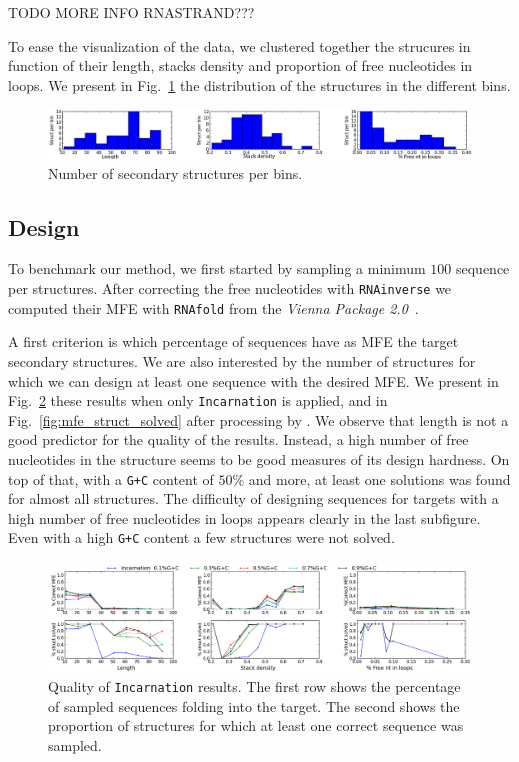  TODO MORE INFO RNASTRAND???
 
 To ease the visualization of the data, we clustered together the strucures
 in function of their length, stacks density and proportion of free 
 nucleotides in loops. We present in Fig.~\ref{fig:bins} the distribution
 of the structures in the different bins.
 
 \begin{figure}[ht!]
 	\centering
	\includegraphics[scale=0.45]{Figures/bins_distribution.png}
	\caption{Number of secondary structures per bins.}
	\label{fig:bins}
 \end{figure}
 
 
\subsection{Design}
 To benchmark our method, we first started by sampling a minimum
 $100$ sequence per structures. After correcting the free nucleotides with
 \texttt{RNAinverse} we computed their MFE with \texttt{RNAfold} from the \textit{Vienna Package 2.0}~\cite{Hofacker:1994}.
 
A first criterion is which percentage of sequences have as MFE the target
secondary structures. We are also interested by the number of structures
for which we can design at least one sequence with the desired MFE.
We present in 
 Fig.~\ref{fig:mfe_struct_solved_noinverse} these results when only
 \texttt{Incarnation} is applied, and 
in Fig.~\ref{fig:mfe_struct_solved} after processing by \RNAinverse. We observe
that length is not a good predictor for the quality of the results. Instead,
a high number of free nucleotides in the structure seems to be good measures of its design hardness. 
On top of that, with a \texttt{G+C} content of $50\%$ and more, at least
one solutions was found for almost all structures. The difficulty of 
designing sequences for targets with a high number of free nucleotides 
 in loops appears clearly in the last subfigure. Even with a high \texttt{G+C} content a few structures were not solved. 

\begin{figure}[ht!]	
	\centering
	\includegraphics[scale=0.45]{Figures/mfe_struct_solve_nornainverse.png}
	\caption{Quality of \texttt{Incarnation} results. The first row shows the percentage
	of sampled sequences folding into the target. The second shows the 	
	proportion	of structures for which at least one correct sequence was 
	sampled.}
	\label{fig:mfe_struct_solved_noinverse}	
\end{figure}



